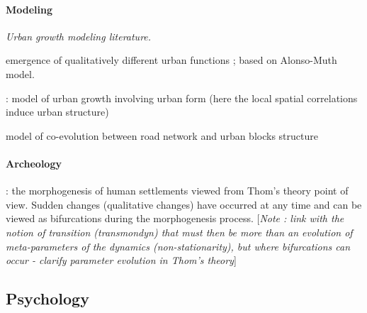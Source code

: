 \documentclass{article}
\begin{document}
\paragraph{Modeling}

\textit{Urban growth modeling literature.}

\cite{bonin2012modele} emergence of qualitatively different urban functions ; based on Alonso-Muth model.

\cite{makse1998modeling} : model of urban growth involving urban form (here the local spatial correlations induce urban structure)

\cite{achibet2014model} model of co-evolution between road network and urban blocks structure

\paragraph{Archeology}

\cite{renfrew1978trajectory} : the morphogenesis of human settlements viewed from Thom's theory point of view. Sudden changes (qualitative changes) have occurred at any time and can be viewed as bifurcations during the morphogenesis process. [\textit{Note : link with the notion of transition (transmondyn) that must then be more than an evolution of meta-parameters of the dynamics (non-stationarity), but where bifurcations can occur - clarify parameter evolution in Thom's theory}]




\subsection{Psychology}


\cite{straus1977societal}


\end{document}
